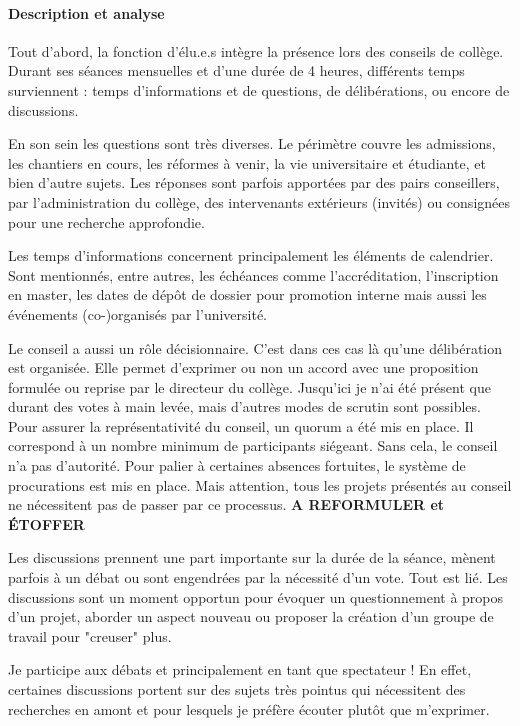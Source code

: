 \documentclass{article}
\begin{document}
\paragraph{Description et analyse}
Tout d'abord, la fonction d'élu.e.s intègre la présence lors des conseils de collège. 
Durant ses séances mensuelles et d'une durée de 4 heures, différents temps surviennent : temps d'informations et de questions, de délibérations, ou encore de discussions.

En son sein les questions sont très diverses. Le périmètre couvre les admissions, les chantiers en cours, les réformes à venir, la vie universitaire et étudiante, et bien d'autre sujets. Les réponses sont parfois apportées par des pairs conseillers, par l'administration du collège, des intervenants extérieurs (invités) ou consignées pour une recherche approfondie. 

Les temps d'informations concernent principalement les éléments de calendrier. Sont mentionnés, entre autres, les échéances comme l'accréditation, l'inscription en master, les dates de dépôt de dossier pour promotion interne mais aussi les événements (co-)organisés par l'université.

Le conseil a aussi un rôle décisionnaire. C'est dans ces cas là qu'une délibération est organisée. Elle permet d'exprimer ou non un accord avec une proposition formulée ou reprise par le directeur du collège. Jusqu'ici je n'ai été présent que durant des votes à main levée, mais d'autres modes de scrutin sont possibles. Pour assurer la représentativité du conseil, un quorum a été mis en place. Il correspond à un nombre minimum de participants siégeant. Sans cela, le conseil n'a pas d'autorité. Pour palier à certaines absences fortuites, le système de procurations est mis en place. Mais attention, tous les projets présentés au conseil ne nécessitent pas de passer par ce processus. \textbf{A REFORMULER et ÉTOFFER}

Les discussions prennent une part importante sur la durée de la séance, mènent parfois à un débat ou sont engendrées par la nécessité d'un vote. Tout est lié. Les discussions sont un moment opportun pour évoquer un questionnement à propos d'un projet, aborder un aspect nouveau ou proposer la création d'un groupe de travail pour "creuser" plus. 




Je participe aux débats et principalement en tant que spectateur ! En effet, certaines discussions portent sur des sujets très pointus qui nécessitent des recherches en amont et pour lesquels je préfère écouter plutôt que m'exprimer. 
\end{document}
